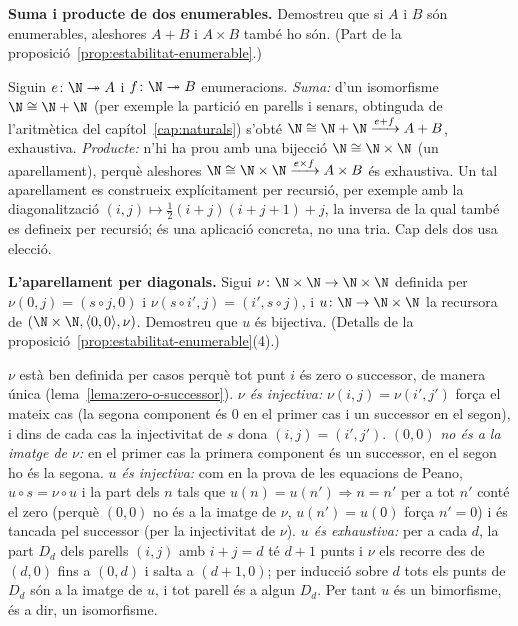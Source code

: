 \begin{exercici}
\textbf{Suma i producte de dos enumerables.} Demostreu que si \(A\) i \(B\) són enumerables, aleshores \(A+B\) i \(A\times B\) també ho són. (Part de la proposició~\ref{prop:estabilitat-enumerable}.)
\end{exercici}
\begin{solucio}
Siguin \(e\colon\N\twoheadrightarrow A\) i \(f\colon\N\twoheadrightarrow B\) enumeracions. \emph{Suma:} d'un isomorfisme \(\N\cong\N+\N\) (per exemple la partició en parells i senars, obtinguda de l'aritmètica del capítol~\ref{cap:naturals}) s'obté \(\N\cong\N+\N\xrightarrow{e+f}A+B\), exhaustiva. \emph{Producte:} n'hi ha prou amb una bijecció \(\N\cong\N\times\N\) (un aparellament), perquè aleshores \(\N\cong\N\times\N\xrightarrow{e\times f}A\times B\) és exhaustiva. Un tal aparellament es construeix explícitament per recursió, per exemple amb la diagonalització \((i,j)\mapsto\tfrac12(i+j)(i+j+1)+j\), la inversa de la qual també es defineix per recursió; és una aplicació concreta, no una tria. Cap dels dos usa elecció.
\end{solucio}

\begin{exercici}
\textbf{L'aparellament per diagonals.} Sigui \(\nu\colon\N\times\N\to\N\times\N\) definida per \(\nu(0,j)=(s\circ j,0)\) i \(\nu(s\circ i',j)=(i',s\circ j)\), i \(u\colon\N\to\N\times\N\) la recursora de \((\N\times\N,\langle0,0\rangle,\nu)\). Demostreu que \(u\) és bijectiva. (Detalls de la proposició~\ref{prop:estabilitat-enumerable}(4).)
\end{exercici}
\begin{solucio}
\(\nu\) està ben definida per casos perquè tot punt \(i\) és zero o successor, de manera única (lema~\ref{lema:zero-o-successor}). \emph{\(\nu\) és injectiva:} \(\nu(i,j)=\nu(i',j')\) força el mateix cas (la segona component és \(0\) en el primer cas i un successor en el segon), i dins de cada cas la injectivitat de \(s\) dona \((i,j)=(i',j')\). \emph{\((0,0)\) no és a la imatge de \(\nu\):} en el primer cas la primera component és un successor, en el segon ho és la segona. \emph{\(u\) és injectiva:} com en la prova de les equacions de Peano, \(u\circ s=\nu\circ u\) i la part dels \(n\) tals que \(u(n)=u(n')\Rightarrow n=n'\) per a tot \(n'\) conté el zero (perquè \((0,0)\) no és a la imatge de \(\nu\), \(u(n')=u(0)\) força \(n'=0\)) i és tancada pel successor (per la injectivitat de \(\nu\)). \emph{\(u\) és exhaustiva:} per a cada \(d\), la part \(D_d\) dels parells \((i,j)\) amb \(i+j=d\) té \(d+1\) punts i \(\nu\) els recorre des de \((d,0)\) fins a \((0,d)\) i salta a \((d+1,0)\); per inducció sobre \(d\) tots els punts de \(D_d\) són a la imatge de \(u\), i tot parell és a algun \(D_d\). Per tant \(u\) és un bimorfisme, és a dir, un isomorfisme.
\end{solucio}

